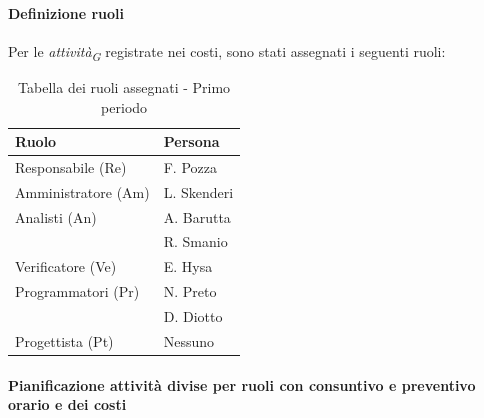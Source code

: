 \paragraph{Definizione ruoli}
Per le \textit{attività}\textsubscript{\textit{G}} registrate nei costi, sono stati assegnati i seguenti ruoli: 

\vspace{0.4cm}

\begin{table}[H]
    \centering
    \begin{tabular}{|L{4cm}|L{2cm}|}
        \hline
        \textbf{Ruolo} & \textbf{Persona} \\
        \hline
        \hline
        Responsabile (Re)   & F. Pozza \\
        \hline
        Amministratore (Am) & L. Skenderi \\
        \hline
        Analisti (An)       & A. Barutta \\
                            & R. Smanio \\
        \hline
        Verificatore (Ve)   & E. Hysa \\
        \hline
        Programmatori (Pr)  & N. Preto \\
                            & D. Diotto \\
        \hline
        Progettista (Pt)    & Nessuno \\
        \hline
    \end{tabular}
    \caption{Tabella dei ruoli assegnati - Primo periodo}
    \label{tab:Ruoli_persone_1}
    \end{table}

\newpage
\paragraph{Pianificazione attività divise per ruoli con consuntivo e preventivo orario e dei costi}

\vspace{0.4cm}

